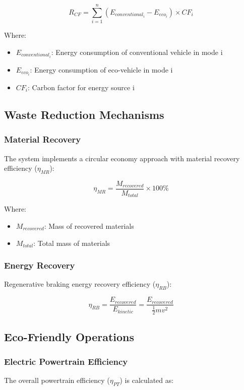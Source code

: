 \documentclass[12pt,a4paper]{article}
\begin{document}
\begin{equation}
R_{CF} = \sum_{i=1}^{n} (E_{conventional_i} - E_{eco_i}) \times CF_i
\end{equation}

Where:
\begin{itemize}
    \item \(E_{conventional_i}\): Energy consumption of conventional vehicle in mode i
    \item \(E_{eco_i}\): Energy consumption of eco-vehicle in mode i
    \item \(CF_i\): Carbon factor for energy source i
\end{itemize}

\subsection{Waste Reduction Mechanisms}
\subsubsection{Material Recovery}
The system implements a circular economy approach with material recovery efficiency (\(\eta_{MR}\)):

\begin{equation}
\eta_{MR} = \frac{M_{recovered}}{M_{total}} \times 100\%
\end{equation}

Where:
\begin{itemize}
    \item \(M_{recovered}\): Mass of recovered materials
    \item \(M_{total}\): Total mass of materials
\end{itemize}

\subsubsection{Energy Recovery}
Regenerative braking energy recovery efficiency (\(\eta_{RB}\)):

\begin{equation}
\eta_{RB} = \frac{E_{recovered}}{E_{kinetic}} = \frac{E_{recovered}}{\frac{1}{2}mv^2}
\end{equation}

\subsection{Eco-Friendly Operations}
\subsubsection{Electric Powertrain Efficiency}
The overall powertrain efficiency (\(\eta_{PT}\)) is calculated as:
\end{document}
